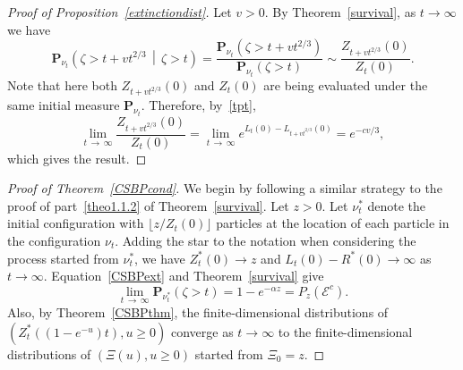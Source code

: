 \documentclass[AHL,Unicode,longabstracts,published]{cedram}
\renewcommand*\P{\mathbf{P}}
\newcommand{\clE}{\mathcal{E}}
\newcommand{\1} {\mathds{1}}
\begin{document}
\begin{proof}[Proof of Proposition~\ref{extinctiondist}]
Let $v > 0$. By Theorem~\ref{survival}, as $t \rightarrow \infty$ we have
\[
\P_{\nu_t}\left(\zeta > t + v t^{2/3}\,\middle|\,\zeta > t\right) = \frac{\P_{\nu_t}\left(\zeta > t + v t^{2/3}\right)}{\P_{\nu_t}(\zeta > t)} \sim \frac{Z_{t + vt^{2/3}}(0)}{Z_t(0)}.
\]
Note that here both $Z_{t+vt^{2/3}}(0)$ and $Z_t(0)$ are being evaluated under the same initial measure $\P_{\nu_t}$. Therefore, by~\eqref{tpt},
\[
\lim_{t\,\rightarrow\,\infty} \frac{Z_{t + vt^{2/3}}(0)}{Z_t(0)} = \lim_{t\,\rightarrow\,\infty} e^{L_t(0) - L_{t + vt^{2/3}}(0)} = e^{-cv/3},
\]
which gives the result.
\end{proof}

\begin{proof}[Proof of Theorem~\ref{CSBPcond}]
We begin by following a similar strategy to the proof of part~\eqref{theo1.1.2} of Theorem~\ref{survival}. Let $z > 0$. Let $\nu_t^*$ denote the initial configuration with $\lfloor z/Z_t(0) \rfloor$ particles at the location of each particle in the configuration $\nu_t$. Adding the star to the notation when considering the process started from $\nu_t^*$, we have $Z_t^*(0) \rightarrow z$ and $L_t(0) - R^*(0) \rightarrow \infty$ as $t \rightarrow \infty$. Equation~\eqref{CSBPext} and Theorem~\ref{survival} give
\begin{equation}\label{starprob}
\lim_{t\,\rightarrow\,\infty} \P_{\nu^*_t}(\zeta > t) = 1 - e^{-\alpha z} = P_z\left(\clE^c\right).
\end{equation}
Also, by Theorem~\ref{CSBPthm}, the finite-dimensional distributions of $(Z_t^*((1 - e^{-u})t), u \geq 0)$ converge as $t \rightarrow \infty$ to the finite-dimensional distributions of $(\Xi(u), u \geq 0)$ started from $\Xi_0 = z$.


\end{proof}
\end{document}

